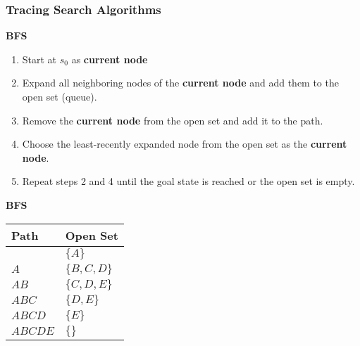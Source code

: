 \begin{example}
    
\end{example}
\newpage

\subsubsection{Tracing Search Algorithms}
\begin{example}
\end{example}

\begin{process} \textbf{BFS}
    \begin{enumerate}
        \item Start at $s_0$ as \textbf{current node}
        \item Expand all neighboring nodes of the \textbf{current node} and add them to the open set (queue).
        \item Remove the \textbf{current node} from the open set and add it to the path. 
        \item Choose the least-recently expanded node from the open set as the \textbf{current node}.
        \item Repeat steps 2 and 4 until the goal state is reached or the open set is empty.
    \end{enumerate}
\end{process}

\begin{example} \textbf{BFS}
    \begin{center}
        \begin{tabular}{ll}
        \toprule
        \textbf{Path} & \textbf{Open Set} \\
        \midrule
         & $\{A\}$ \\
        $A$ & $\{B, C, D\}$ \\
        $AB$ & $\{C, D, E\}$ \\
        $ABC$ & $\{D, E\}$ \\
        $ABCD$ & $\{E\}$ \\
        $ABCDE$ & $\{\}$ \\
        \bottomrule
        \end{tabular}
    \end{center}
\end{example}

